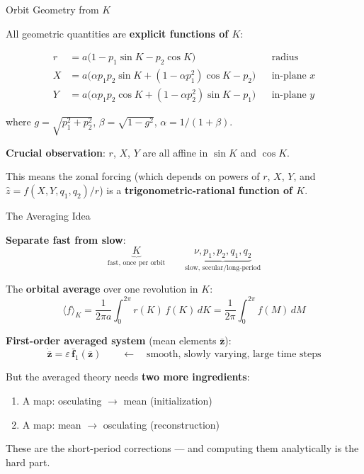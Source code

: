 \documentclass[aspectratio=169, 11pt]{beamer}
\newcommand{\eps}{\varepsilon}
\newcommand{\mean}[1]{\langle #1 \rangle}
\begin{document}
\begin{frame}{Orbit Geometry from $K$}

All geometric quantities are \textbf{explicit functions of $K$}:

\begin{align*}
r &= a\bigl(1 - p_1 \sin K - p_2 \cos K\bigr)
& &\text{radius} \\[4pt]
X &= a\bigl(\alpha p_1 p_2 \sin K + (1-\alpha p_1^2)\cos K - p_2\bigr)
& &\text{in-plane } x \\[4pt]
Y &= a\bigl(\alpha p_1 p_2 \cos K + (1-\alpha p_2^2)\sin K - p_1\bigr)
& &\text{in-plane } y
\end{align*}

where $g = \sqrt{p_1^2 + p_2^2}$, \;
$\beta = \sqrt{1 - g^2}$, \;
$\alpha = 1/(1+\beta)$.

\vspace{0.5em}
\textbf{Crucial observation}:
$r$, $X$, $Y$ are all \alert{affine in $\sin K$ and $\cos K$}.

\vspace{0.3em}
This means the zonal forcing (which depends on powers of $r$,
$X$, $Y$, and $\hat z = f(X, Y, q_1, q_2)/r$) is a
\textbf{trigonometric-rational function of $K$}.

\end{frame}

\begin{frame}{The Averaging Idea}

\textbf{Separate fast from slow}:
\vspace{-0.5em}
\[
\underbrace{K}_{\text{fast, once per orbit}}
\qquad
\underbrace{\nu, p_1, p_2, q_1, q_2}_{\text{slow, secular/long-period}}
\]

\vspace{-0.4em}
The \textbf{orbital average} over one revolution in $K$:
\vspace{-0.3em}
\[
\mean{f}_K
= \frac{1}{2\pi a}\int_0^{2\pi} r(K)\,f(K)\,dK
= \frac{1}{2\pi}\int_0^{2\pi} f(M)\,dM
\]

\vspace{-0.4em}
\textbf{First-order averaged system} (mean elements $\bar{\bm z}$):
\vspace{-0.3em}
\[
\dot{\bar{\bm z}} = \eps\,\bar{\bm f}_1(\bar{\bm z})
\qquad \longleftarrow \quad
\text{smooth, slowly varying, large time steps}
\]

\vspace{-0.4em}
But the averaged theory needs \textbf{two more ingredients}:
\begin{enumerate}\setlength{\itemsep}{0.1em}
    \item A map: \; osculating $\to$ mean \; (initialization)
    \item A map: \; mean $\to$ osculating \; (reconstruction)
\end{enumerate}

\vspace{-0.3em}
These are the \alert{short-period corrections} --- and computing them
analytically is the hard part.

\end{frame}
\end{document}
